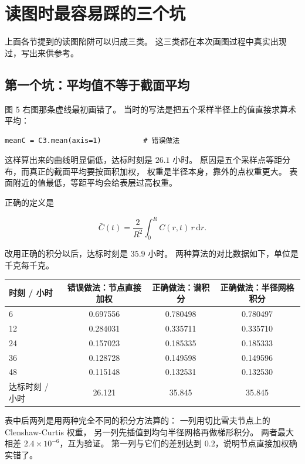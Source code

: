 \documentclass[11pt,a4paper]{article}
\begin{document}
\section{读图时最容易踩的三个坑}

上面各节提到的读图陷阱可以归成三类。
这三类都在本次画图过程中真实出现过，写出来供参考。

\subsection{第一个坑：平均值不等于截面平均}

图 5 右图那条虚线最初画错了。
当时的写法是把五个采样半径上的值直接求算术平均：

\begin{lstlisting}
meanC = C3.mean(axis=1)          # 错误做法
\end{lstlisting}

这样算出来的曲线明显偏低，达标时刻是 $26.1$ 小时。
原因是五个采样点等距分布，而真正的截面平均要按面积加权，
权重是半径本身，靠外的点权重更大。
表面附近的值最低，等距平均会给表层过高权重。

正确的定义是

\begin{equation}
\bar C(t)=\frac{2}{R^2}\int_0^{R}C(r,t)\,r\,\mathrm{d}r .
\end{equation}

改用正确的积分以后，达标时刻是 $35.9$ 小时。
两种算法的对比数据如下，单位是千克每千克。

\begin{center}
\begin{tabular}{@{}lccc@{}}
\toprule
时刻 / 小时 & 错误做法：节点直接加权 & 正确做法：谱积分 & 正确做法：半径网格积分 \\
\midrule
6 & 0.697556 & 0.780498 & 0.780497 \\
12 & 0.284031 & 0.335711 & 0.335710 \\
24 & 0.157023 & 0.185335 & 0.185333 \\
36 & 0.128728 & 0.149598 & 0.149596 \\
48 & 0.115148 & 0.132531 & 0.132530 \\
达标时刻 / 小时 & 26.121 & 35.845 & 35.845 \\
\bottomrule
\end{tabular}
\end{center}

表中后两列是用两种完全不同的积分方法算的：
一列用切比雪夫节点上的 Clenshaw-Curtis 权重，
另一列先插值到均匀半径网格再做梯形积分。
两者最大相差 $2.4\times10^{-6}$，互为验证。
第一列与它们的差别达到 $0.2$，说明节点直接加权确实错了。
\end{document}
